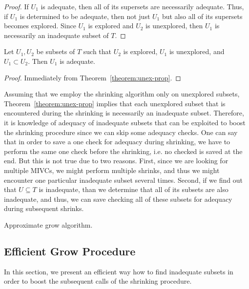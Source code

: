 \begin{proof}
If $U_1$ is adequate, then all of its supersets are necessarily adequate. Thus, if $U_1$ is determined to be adequate, then not just $U_1$ but also all of its supersets becomes explored. Since $U_1$ is explored and $U_2$ is unexplored, then $U_1$ is necessarily an inadequate subset of $T$.
\end{proof}

\begin{corollary}
Let $U_1, U_2$ be subsets of $T$ such that $U_2$ is explored, $U_1$ is unexplored, and $U_1 \subset U_2$. Then $U_1$ is adequate.
\end{corollary}

\begin{proof}
Immediately from Theorem~\ref{theorem:unex-prop}. 
\end{proof}

Assuming that we employ the shrinking algorithm only on unexplored subsets, Theorem~\ref{theorem:unex-prop} implies that each unexplored subset that is encountered during the shrinking is necessarily an inadequate subset. Therefore, it is knowledge of adequacy of inadequate subsets that can be exploited to boost the shrinking procedure since we can skip some adequacy checks. One can say that in order to save a one check for adequacy during shrinking, we have to perform the same one check before the shrinking, i.e. no checked is saved at the end. But this is not true due to two reasons. First, since we are looking for multiple MIVCs, we might perform multiple shrinks, and thus we might encounter one particular inadequate subset several times. Second, if we find out that $U \subseteq T$ is inadequate, than we determine that all of its subsets are also inadequate, and thus, we can save checking all of these subsets for adequacy during subsequent shrinks. 

\begin{algorithm}[!t]

\caption{Approximate grow algorithm.}
\end{algorithm}



\subsection{Efficient Grow Procedure}
In this section, we present an efficient way how to find inadequate subsets in order to boost the subsequent calls of the shrinking procedure.

